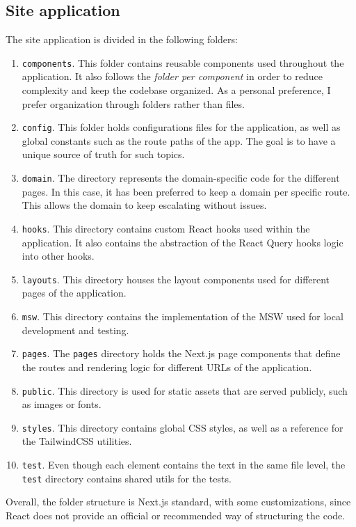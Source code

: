 \documentclass[./memory.tex]{subfiles}
\begin{document}
\subsection{Site application}
The site application is divided in the following folders:
\begin{enumerate}[label = -]
	\item\texttt{components}. This folder contains reusable components used
	throughout the application. It also follows the \emph{folder per component}
	in order to reduce complexity and keep the codebase organized. As a personal
	preference, I prefer organization through folders rather than files.
	\item\texttt{config}. This folder holds configurations files for the
	application, as well as global constants such as the route paths of the app.
	The goal is to have a unique source of truth for such topics.
	\item\texttt{domain}. The directory represents the domain-specific code for
	the different pages. In this case, it has been preferred to keep a
	domain per specific route. This allows the domain to keep escalating
	without issues.
	\item\texttt{hooks}. This directory contains custom React hooks used
	within the application. It also contains the abstraction of the React
	Query hooks logic into other hooks.
	\item\texttt{layouts}. This directory houses the layout components used
	for different pages of the application.
	\item\texttt{msw}. This directory contains the implementation of the MSW used
	for local development and testing.
	\item\texttt{pages}. The \texttt{pages} directory holds the Next.js page
	components that define the routes and rendering logic for different URLs
	of the application.
	\item\texttt{public}. This directory is used for static assets that are served
	publicly, such as images or fonts.
	\item\texttt{styles}. This directory contains global CSS styles, as well as a
	reference for the TailwindCSS utilities.
	\item\texttt{test}. Even though each element contains the text in the same
	file level, the \texttt{test} directory contains shared utils for the tests.
\end{enumerate}
Overall, the folder structure is Next.js standard, with some customizations,
since React does not provide an official or recommended way of structuring the
code.
\end{document}
